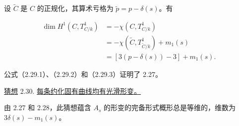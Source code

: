 设 $\widetilde C$ 是 $C$ 的正规化，其算术亏格为 $\widetilde p=p-\delta(s)$。有

\begin{equation}\tag{2.29.3}
\begin{aligned}
\dim H^1(C,T^1_{C/k})
&=-\chi(C,T^1_{C/k})\\
&=-\chi(\widetilde C,T^1_{\widetilde C/k})+m_1(s)\\
&=[3(p-\delta(s))-3]+m_1(s).
\end{aligned}
\end{equation}

公式（2.29.1）、（2.29.2）和（2.29.3）证明了 2.27。

\underline{猜想} 2.30. \underline{每条约化固有曲线均有光滑形变。}

由 2.27 和 2.28，此猜想蕴含 $A_s$ 的形变的完备形式概形总是等维的，维数为 $3\delta(s)-m_1(s)$。